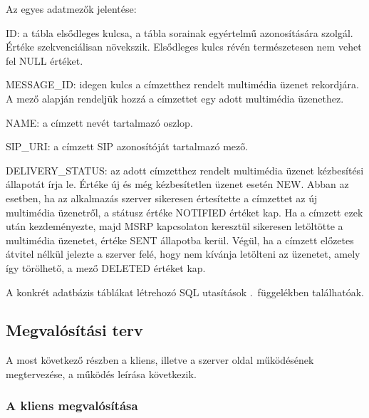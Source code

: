 Az egyes adatmezők jelentése:
\begin{mydescription}
\item[ID:] a tábla elsődleges kulcsa, a tábla sorainak egyértelmű azonosítására szolgál. Értéke szekvenciálisan növekszik. Elsődleges kulcs révén természetesen nem vehet fel NULL értéket.
\item[MESSAGE\_ID:] idegen kulcs a címzetthez rendelt multimédia üzenet rekordjára. A mező alapján rendeljük hozzá a címzettet egy adott multimédia üzenethez.
\item[NAME:]  a címzett nevét tartalmazó oszlop.
\item[SIP\_URI:] a címzett SIP azonosítóját tartalmazó mező.
\item[DELIVERY\_STATUS:] az adott címzetthez rendelt multimédia üzenet kézbesítési állapotát írja le. Értéke új és még kézbesítetlen üzenet esetén NEW. Abban az esetben, ha az alkalmazás szerver sikeresen értesítette a címzettet az új multimédia üzenetről, a státusz értéke NOTIFIED értéket kap. Ha a címzett ezek után kezdeményezte, majd MSRP kapcsolaton keresztül sikeresen letöltötte a multimédia üzenetet, értéke SENT állapotba kerül. Végül, ha a címzett előzetes átvitel nélkül jelezte a szerver felé, hogy nem kívánja letölteni az üzenetet, amely így törölhető, a mező DELETED értéket kap.
\end{mydescription}

A konkrét adatbázis táblákat létrehozó SQL utasítások .~függelékben találhatóak.
\medskip

\subsection{Megvalósítási terv}
\label{sec:megvalositas}

A most következő részben a kliens, illetve a szerver oldal működésének megtervezése, a működés leírása következik.

\subsubsection{A kliens megvalósítása}
\label{sec:kliensmegvalositas}

